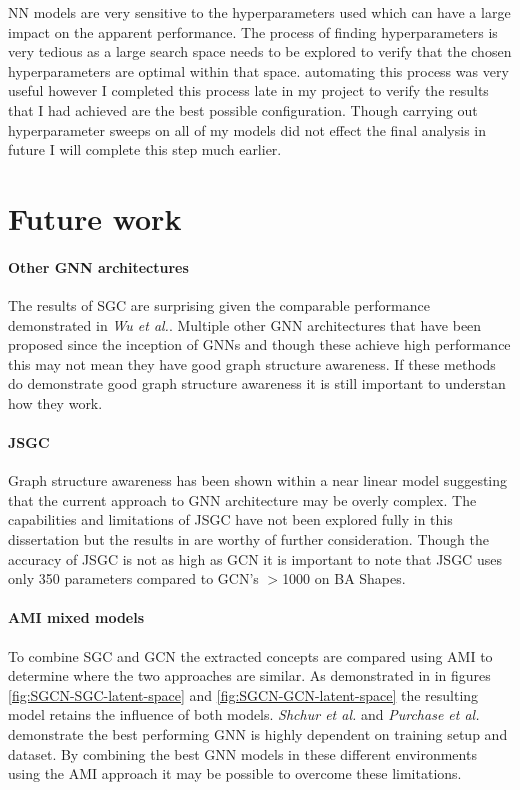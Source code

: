NN models are very sensitive to the hyperparameters used which can have a large impact on the apparent performance.
The process of finding hyperparameters is very tedious as a large search space needs to be explored to verify that the chosen hyperparameters are optimal within that space.
automating this process was very useful however I completed this process late in my project to verify the results that I had achieved are the best possible configuration.
Though carrying out hyperparameter sweeps on all of my models did not effect the final analysis in future I will complete this step much earlier.

\section{Future work}
\paragraph{Other GNN architectures}
The results of SGC are surprising given the comparable performance demonstrated in \textit{Wu et al.}\cite{wu2019simplifying}.
Multiple other GNN architectures that have been proposed since the inception of GNNs and though these achieve high performance this may not mean they have good graph structure awareness.
If these methods do demonstrate good graph structure awareness it is still important to understan how they work.

\paragraph{JSGC}
Graph structure awareness has been shown within a near linear model suggesting that the current approach to GNN architecture may be overly complex.
The capabilities and limitations of JSGC have not been explored fully in this dissertation but the results in  are worthy of further consideration.
Though the accuracy of JSGC is not as high as GCN it is important to note that JSGC uses only 350 parameters compared to GCN's $>$1000 on BA Shapes.

\paragraph{AMI mixed models}
To combine SGC and GCN the extracted concepts are compared using AMI to determine where the two approaches are similar.
As demonstrated in  in figures \ref{fig:SGCN-SGC-latent-space} and \ref{fig:SGCN-GCN-latent-space} the resulting model retains the influence of both models.
\textit{Shchur et al.}\cite{shchur2018pitfalls} and \textit{Purchase et al.}\cite{purchase2022revisiting} demonstrate the best performing GNN is highly dependent on training setup and dataset.
By combining the best GNN models in these different environments using the AMI approach it may be possible to overcome these limitations.
